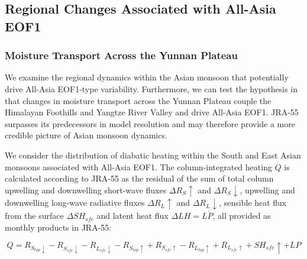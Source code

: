 
\subsection{Regional Changes Associated with All-Asia EOF1}

\subsubsection{Moisture Transport Across the Yunnan Plateau}

	We examine the regional dynamics within the Asian monsoon that potentially drive All-Asia EOF1-type variability. Furthermore, we can test the hypothesis in \citet{Day2015} that changes in moisture transport across the Yunnan Plateau couple the Himalayan Foothills and Yangtze River Valley and drive All-Asia EOF1. JRA-55 surpasses its predecessors in model resolution and may therefore provide a more credible picture of Asian monsoon dynamics.
	

	We consider the distribution of diabatic heating within the South and East Asian monsoons associated with All-Asia EOF1. The column-integrated heating $Q$ is calculated according to JRA-55 as the residual of the sum of total column upwelling and downwelling short-wave fluxes $\Delta R_S\uparrow$ and $\Delta R_S\downarrow$, upwelling and downwelling long-wave radiative fluxes $\Delta R_L\uparrow$ and $\Delta R_L\downarrow$, sensible heat flux from the surface  $\Delta SH_{sfc}$ and latent heat flux  $\Delta LH=L \dot P$, all provided as monthly products in JRA-55:
	
\begin{equation}
	Q=R_{S_{top}\downarrow}-R_{S_{sfc}\downarrow}-R_{L_{sfc}\downarrow}-R_{S_{top}\uparrow}+R_{S_{sfc}\uparrow}-R_{L_{top}\uparrow}+R_{L_{sfc}\uparrow}+SH_{sfc}\uparrow+LP
\end{equation}
	
